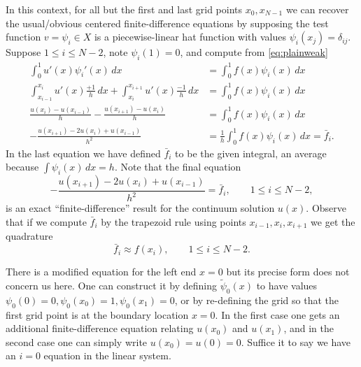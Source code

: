 \documentclass[12pt]{amsart}
\begin{document}
In this context, for all but the first and last grid points $x_0,x_{N-1}$ we can recover the usual/obvious centered finite-difference equations by supposing the test function $v=\psi_i \in X$ is a piecewise-linear hat function with values $\psi_i(x_j) = \delta_{ij}$.  Suppose $1 \le i \le N-2$, note $\psi_i(1)=0$, and compute from \eqref{eq:plainweak}
\begin{align*}
\int_0^1 u'(x) \psi_i'(x)\,dx &= \int_0^1 f(x) \psi_i(x)\,dx \\
\int_{x_{i-1}}^{x_i} u'(x) \frac{+1}{h}\,dx + \int_{x_{i}}^{x_{i+1}} u'(x)  \frac{-1}{h}\,dx &= \int_0^1 f(x) \psi_i(x)\,dx \\
\frac{u(x_i)-u(x_{i-1})}{h} - \frac{u(x_{i+1})-u(x_i)}{h} &= \int_0^1 f(x) \psi_i(x)\,dx \\
- \frac{u(x_{i+1}) - 2 u(x_i) + u(x_{i-1})}{h^2} &= \frac{1}{h} \int_0^1 f(x) \psi_i(x)\,dx = \bar f_i.
\end{align*}
In the last equation we have defined $\bar f_i$ to be the given integral, an average because $\int \psi_i(x)\,dx = h$.  Note that the final equation
\begin{equation}
- \frac{u(x_{i+1}) - 2 u(x_i) + u(x_{i-1})}{h^2} = \bar f_i, \qquad 1 \le i \le N-2, \label{eq:exactfdgeneric}
\end{equation}
is an exact ``finite-difference'' result for the continuum solution $u(x)$.  Observe that if we compute $\bar f_i$ by the trapezoid rule using points $x_{i-1},x_i,x_{i+1}$ we get the quadrature
\begin{equation}
\bar f_i \approx f(x_i), \qquad 1 \le i \le N-2. \label{eq:fquadraturegeneric}
\end{equation}

There is a modified equation for the left end $x=0$ but its precise form does not concern us here.  One can construct it by defining $\tilde \psi_0(x)$ to have values $\psi_0(0)=0, \psi_0(x_0)=1, \psi_0(x_1)=0$, or by re-defining the grid so that the first grid point is at the boundary location $x=0$.  In the first case one gets an additional finite-difference equation relating $u(x_0)$ and $u(x_1)$, and in the second case one can simply write $u(x_0)=u(0)=0$.  Suffice it to say we have an $i=0$ equation in the linear system.
\end{document}
